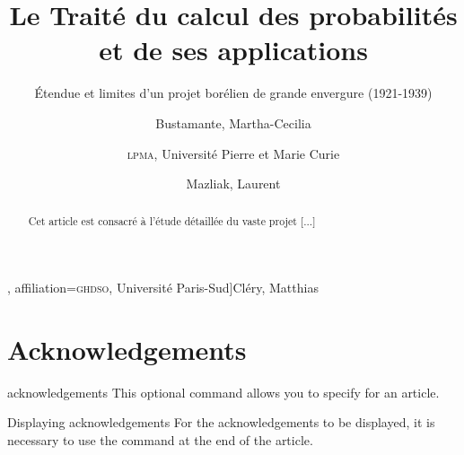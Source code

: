 \documentclass[english,nolocaltoc]{nwejmart}
\newtheorem[style=definition]{fact}
\newtheorem[title-plural=Criteria]{criterion}
\newtheorem[title=random experiment]{rexp}
\begin{document}
\begin{bodycode}[listing options={deletekeywords={[2]title,article},deletekeywords={[5]keywords}}]
\title[Le Traité du calcul des probabilités]{Le Traité du calcul des
  probabilités et de ses applications}
\subtitle[Étendue et limites d'un projet borélien]{Étendue et
  limites d'un projet borélien de grande envergure (1921-1939)}
%
\author[
  affiliation={Laboratoire \textsc{sphere}, Université Paris Diderot}
  ]{Bustamante, Martha-Cecilia}
\author[
  affiliation=[aff2]{\textsc{lpma}, Université Pierre et Marie Curie},
  affiliation={\textsc{ghdso}, Université Paris-Sud}]{Cléry, Matthias}
\author[
  affiliationtagged={aff2}
]{Mazliak, Laurent}
%
\begin{abstract}
  Cet article est consacré à l'étude détaillée du vaste projet [...]
\end{abstract}
%
%
\maketitle
\end{bodycode}

\section{Acknowledgements}
\label{sec:remerciements}

\begin{docCommand}{acknowledgements}{}
  This optional command allows you to specify  for an article.
\end{docCommand}

\begin{bodycode}[listing options={deletekeywords={[2]first}}]
\end{bodycode}

\begin{dbremark}{Displaying acknowledgements}{}
  For the acknowledgements to be displayed, it is necessary to use the
   command at the end of the article.
\end{dbremark}
\end{document}

